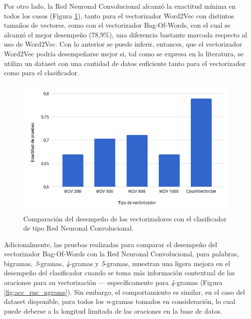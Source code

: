 \documentclass[conference]{IEEEtran}
\begin{document}
        Por otro lado, la Red Neuronal Convolucional alcanzó la exactitud mínima en todos los casos (Figura \ref{fig:acc_rnc}), tanto para el vectorizador Word2Vec con distintos tamaños de vectores, como con el vectorizador Bag-Of-Words, con el cual se alcanzó el mejor desempeño (78,9\%), una diferencia bastante marcada respecto al uso de Word2Vec. Con lo anterior se puede inferir, entonces, que el vectorizador Word2Vec podría desempeñarse mejor si, tal como se expresa en la literatura, se utiliza un dataset con una cantidad de datos suficiente tanto para el vectorizador como para el clasificador.
        
        \begin{figure}[htbp]
            \centerline{\includegraphics[width=\linewidth]{figuras/acc_rnc.png}}
            \caption{Comparación del desempeño de los vectorizadores con el clasificador de tipo Red Neuronal Convolucional.}
            \label{fig:acc_rnc}
        \end{figure}
    
        Adicionalmente, las pruebas realizadas para comparar el desempeño del vectorizador Bag-Of-Words con la Red Neuronal Convolucional, para palabras, bigramas, \textit{3}-gramas, \textit{4}-gramas y \textit{5}-gramas, muestran una ligera mejora en el desempeño del clasificador cuando se toma más información contextual de las oraciones para su vectorización --- específicamente para \textit{4}-gramas (Figura \ref{fig:acc_rnc_ngrams}). Sin embargo, el comportamiento es similar, en el caso del dataset disponible, para todos los \textit{n}-gramas tomados en consideración, lo cual puede deberse a la longitud limitada de las oraciones en la base de datos.
        
\end{document}
